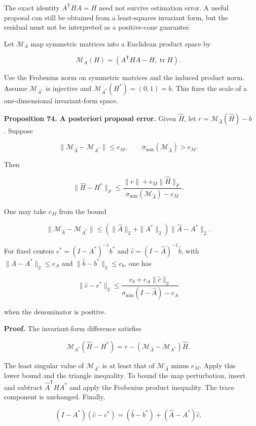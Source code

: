 \documentclass[11pt,letterpaper]{article}
\begin{document}
The exact identity \(A^{\mathsf T}HA=H\) need not survive estimation
error. A useful proposal can still be obtained from a least-squares
invariant form, but the residual must not be interpreted as a
positive-cone guarantee.

Let \(\mathcal M_A\) map symmetric matrices into a Euclidean product
space by

\[
\mathcal M_A(H)=(A^{\mathsf T}HA-H,\operatorname{tr}H).
\]

Use the Frobenius norm on symmetric matrices and the induced product
norm. Assume \(\mathcal M_{A^*}\) is injective and
\(\mathcal M_{A^*}(H^*)=(0,1)=b\). This fixes the scale of a
one-dimensional invariant-form space.

\textbf{Proposition 74. A posteriori proposal error.} Given
\(\widehat H\), let \(r=\mathcal M_{\widehat A}(\widehat H)-b\). Suppose

\[
\|\mathcal M_{\widehat A}-\mathcal M_{A^*}\|\leq e_M,
\qquad \sigma_{\min}(\mathcal M_{\widehat A})>e_M.
\]

Then

\[
\boxed{
\|\widehat H-H^*\|_F
\leq
\frac{\|r\|+e_M\|\widehat H\|_F}
{\sigma_{\min}(\mathcal M_{\widehat A})-e_M}.
}
\]

One may take \(e_M\) from the bound

\[
\|\mathcal M_{\widehat A}-\mathcal M_{A^*}\|\leq(\|\widehat A\|_2+\|A^*\|_2)\|\widehat A-A^*\|_2.
\]

For fixed centers \(c^*=(I-A^*)^{-1}b^*\) and
\(\widehat c=(I-\widehat A)^{-1}\widehat b\), with
\(\|\widehat A-A^*\|_2\leq e_A\) and \(\|\widehat b-b^*\|_2\leq e_b\),
one has

\[
\|\widehat c-c^*\|_2
\leq\frac{e_b+e_A\|\widehat c\|_2}
{\sigma_{\min}(I-\widehat A)-e_A}
\]

when the denominator is positive.

\textbf{Proof.} The invariant-form difference satisfies

\[
\mathcal M_{A^*}(\widehat H-H^*)
=r-(\mathcal M_{\widehat A}-\mathcal M_{A^*})\widehat H.
\]

The least singular value of \(\mathcal M_{A^*}\) is at least that of
\(\mathcal M_{\widehat A}\) minus \(e_M\). Apply this lower bound and
the triangle inequality. To bound the map perturbation, insert and
subtract \(\widehat A^{\mathsf T}HA^*\) and apply the Frobenius product
inequality. The trace component is unchanged. Finally,

\[
(I-A^*)(\widehat c-c^*)=(\widehat b-b^*)+(\widehat A-A^*)\widehat c.
\]
\end{document}
